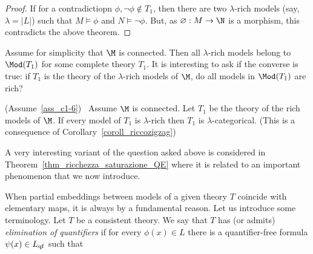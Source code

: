 \begin{proof}
  If for a contradictiopn $\phi,\neg\phi\notin T_1$, then there are two $\lambda$-rich models (say, $\lambda=|L|$) such that $M\models\phi$ and $N\models\neg\phi$.
  But, as $\varnothing:M\to\N$ is a morphism, this contradicts the above theorem.
\end{proof}

Assume for simplicity that $\M$ is connected.
Then all $\lambda$-rich models belong to $\Mod(T_1)$ for some complete theory $T_1$.
It is interesting to ask if the converse is true: if $T_1$ is the theory of the $\lambda$-rich models of $\M$, do all models in $\Mod(T_1)$ are rich?

\begin{remark}
    (Assume~\ref{ass_c1-6})  \  Assume $\M$ is connected.
    Let $T_1$ be the theory of the rich models of $\M$.
    If every model of $T_1$ is $\lambda$-rich then $T_1$ is $\lambda$-categorical.
    (This is a consequence of Corollary~\ref{coroll_riccozigzag})
\end{remark}

A very interesting variant of the question asked above is considered in Theorem~\ref{thm_ricchezza_saturazione_QE} where it is related to an important phenomenon that we now introduce.


When partial embeddings between models of a given theory $T$ coincide with elementary maps, it is always by a fundamental reason.
Let us introduce some terminology.
Let $T$ be a consistent theory.
We say that $T$ has (or admits) \emph{elimination of\/} \emph{quantifiers\/} if for every $\phi(x)\in L$ there is a quantifier-free formula $\psi(x)\in L_{\rm qf}$ such that 


